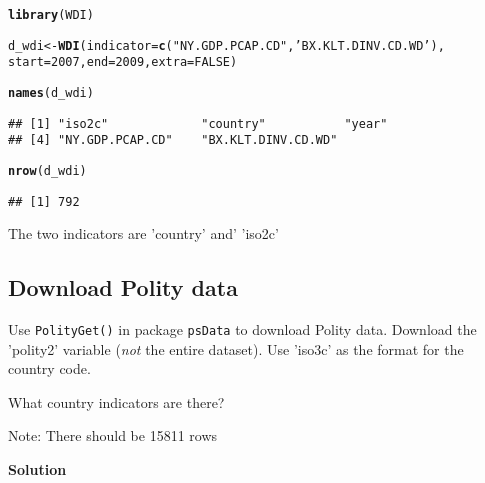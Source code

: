 \documentclass{article}\usepackage[]{graphicx}\usepackage[]{color}
\makeatletter
\newcommand{\hlnum}[1]{\textcolor[rgb]{0.686,0.059,0.569}{#1}}%
\newcommand{\hlstr}[1]{\textcolor[rgb]{0.192,0.494,0.8}{#1}}%
\newcommand{\hlstd}[1]{\textcolor[rgb]{0.345,0.345,0.345}{#1}}%
\newcommand{\hlkwb}[1]{\textcolor[rgb]{0.69,0.353,0.396}{#1}}%
\newcommand{\hlkwc}[1]{\textcolor[rgb]{0.333,0.667,0.333}{#1}}%
\newcommand{\hlkwd}[1]{\textcolor[rgb]{0.737,0.353,0.396}{\textbf{#1}}}%
\newenvironment{kframe}{%
 \def\at@end@of@kframe{}%
 \ifinner\ifhmode%
  \def\at@end@of@kframe{\end{minipage}}%
  \begin{minipage}{\columnwidth}%
 \fi\fi%
 \def\FrameCommand##1{\hskip\@totalleftmargin \hskip-\fboxsep
 \colorbox{shadecolor}{##1}\hskip-\fboxsep
     \hskip-\linewidth \hskip-\@totalleftmargin \hskip\columnwidth}%
 \MakeFramed {\advance\hsize-\width
   \@totalleftmargin\z@ \linewidth\hsize
   \@setminipage}}%
 {\par\unskip\endMakeFramed%
 \at@end@of@kframe}
\newenvironment{knitrout}{}{} %
\makeatother
\begin{document}
\begin{knitrout}
\color{fgcolor}\begin{kframe}
\begin{alltt}
\hlkwd{library}\hlstd{(WDI)}
\end{alltt}


{\ttfamily\noindent\itshape\color{messagecolor}{\#\# Loading required package: RJSONIO}}\begin{alltt}
\hlstd{d_wdi} \hlkwb{<-} \hlkwd{WDI}\hlstd{(}\hlkwc{indicator} \hlstd{=} \hlkwd{c}\hlstd{(}\hlstr{"NY.GDP.PCAP.CD"}\hlstd{,} \hlstr{'BX.KLT.DINV.CD.WD'}\hlstd{),}
             \hlkwc{start} \hlstd{=} \hlnum{2007}\hlstd{,} \hlkwc{end} \hlstd{=} \hlnum{2009}\hlstd{,} \hlkwc{extra} \hlstd{=} \hlnum{FALSE}\hlstd{)}

\hlkwd{names}\hlstd{(d_wdi)}
\end{alltt}
\begin{verbatim}
## [1] "iso2c"             "country"           "year"             
## [4] "NY.GDP.PCAP.CD"    "BX.KLT.DINV.CD.WD"
\end{verbatim}
\begin{alltt}
\hlkwd{nrow}\hlstd{(d_wdi)}
\end{alltt}
\begin{verbatim}
## [1] 792
\end{verbatim}
\end{kframe}
\end{knitrout}

The two indicators are 'country' and' 'iso2c'

\subsection{Download Polity data}

Use \verb`PolityGet()` in package \verb`psData` to download Polity data. Download the 'polity2' variable (\textit{not} the entire dataset). Use 'iso3c' as the format for the country code.

What country indicators are there?

Note: There should be 15811 rows

\textbf{Solution}
\end{document}
